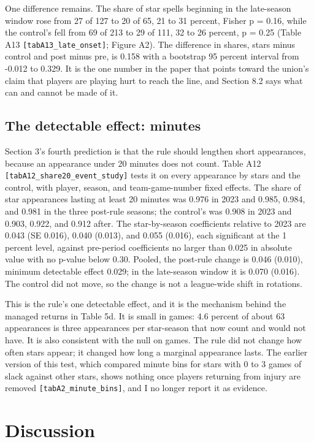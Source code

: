 \documentclass[11pt]{article}
\begin{document}
One difference remains. The share of star spells beginning in the late-season window rose from 27 of 127 to 20 of 65, 21 to 31 percent, Fisher p = 0.16, while the control's fell from 69 of 213 to 29 of 111, 32 to 26 percent, p = 0.25 (Table A13 {\small\texttt{[tabA13\_late\_onset]}}; Figure A2). The difference in shares, stars minus control and post minus pre, is 0.158 with a bootstrap 95 percent interval from -0.012 to 0.329. It is the one number in the paper that points toward the union's claim that players are playing hurt to reach the line, and Section 8.2 says what can and cannot be made of it.


\subsection*{The detectable effect: minutes}


Section 3's fourth prediction is that the rule should lengthen short appearances, because an appearance under 20 minutes does not count. Table A12 {\small\texttt{[tabA12\_share20\_event\_study]}} tests it on every appearance by stars and the control, with player, season, and team-game-number fixed effects. The share of star appearances lasting at least 20 minutes was 0.976 in 2023 and 0.985, 0.984, and 0.981 in the three post-rule seasons; the control's was 0.908 in 2023 and 0.903, 0.922, and 0.912 after. The star-by-season coefficients relative to 2023 are 0.043 (SE 0.016), 0.040 (0.013), and 0.055 (0.016), each significant at the 1 percent level, against pre-period coefficients no larger than 0.025 in absolute value with no p-value below 0.30. Pooled, the post-rule change is 0.046 (0.010), minimum detectable effect 0.029; in the late-season window it is 0.070 (0.016). The control did not move, so the change is not a league-wide shift in rotations.

This is the rule's one detectable effect, and it is the mechanism behind the managed returns in Table 5d. It is small in games: 4.6 percent of about 63 appearances is three appearances per star-season that now count and would not have. It is also consistent with the null on games. The rule did not change how often stars appear; it changed how long a marginal appearance lasts. The earlier version of this test, which compared minute bins for stars with 0 to 3 games of slack against other stars, shows nothing once players returning from injury are removed {\small\texttt{[tabA2\_minute\_bins]}}, and I no longer report it as evidence.


\section{Discussion}
\end{document}
